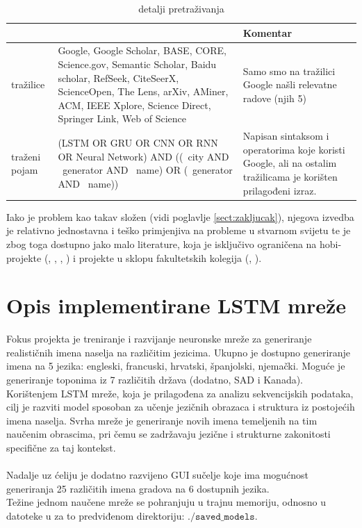 \documentclass[conference]{IEEEtran}
\begin{document}
\begin{table}[H]
\caption{detalji pretraživanja}
\begin{center}
\begin{tabular}{|p{50pt}|p{110pt}|p{70pt}|}
\hline
 & & \textbf{Komentar}\\ \hline
tražilice & Google, Google Scholar, BASE, CORE, Science.gov, Semantic Scholar, Baidu scholar, RefSeek, CiteSeerX, ScienceOpen, The Lens, arXiv, AMiner, ACM, IEEE Xplore, Science Direct,  Springer Link, Web of Science & Samo smo na tražilici Google našli relevatne radove (njih 5)  \\ \hline
traženi pojam & (LSTM OR GRU OR CNN OR RNN OR Neural Network) AND ((~city AND ~generator AND ~name) OR (~generator AND ~name)) & Napisan sintaksom i operatorima koje koristi Google, ali na ostalim tražilicama je korišten prilagođeni izraz.\\ \hline
\end{tabular}
\label{tab:search}
\end{center}
\end{table}

Iako je problem kao takav složen (vidi poglavlje \ref{sect:zakljucak}), njegova izvedba je relativno jednostavna i teško primjenjiva na probleme u stvarnom svijetu te je zbog toga dostupno jako malo literature, koja je isključivo ograničena na hobi-projekte (\cite{master_LSTM}, \cite{name_generator}, \cite{data_name_generator}, \cite{city_name_gen}) i projekte u sklopu fakultetskih kolegija (\cite{randolph}, \cite{unreasonable_eff_of_LSTM}).\\




\section{Opis implementirane LSTM mreže}
Fokus projekta je treniranje i razvijanje neuronske mreže za generiranje realističnih imena naselja na različitim jezicima. Ukupno je dostupno generiranje imena na 5 jezika: engleski, francuski, hrvatski, španjolski, njemački. Moguće je generiranje toponima iz 7 različitih država (dodatno, SAD i Kanada). Korištenjem LSTM mreže, koja je prilagođena za analizu sekvencijskih podataka, cilj je razviti model sposoban za učenje jezičnih obrazaca i struktura iz postojećih imena naselja. Svrha mreže je generiranje novih imena temeljenih na tim naučenim obrascima, pri čemu se zadržavaju jezične i strukturne zakonitosti specifične za taj kontekst.\\
\\
Nadalje uz ćeliju je dodatno razvijeno GUI sučelje koje ima mogućnost generiranja 25 različitih imena gradova na 6 dostupnih jezika.\\
Težine jednom naučene mreže se pohranjuju u trajnu memoriju, odnosno u datoteke u za to predviđenom direktoriju: $\mathtt{./saved\_models}$.
\end{document}

